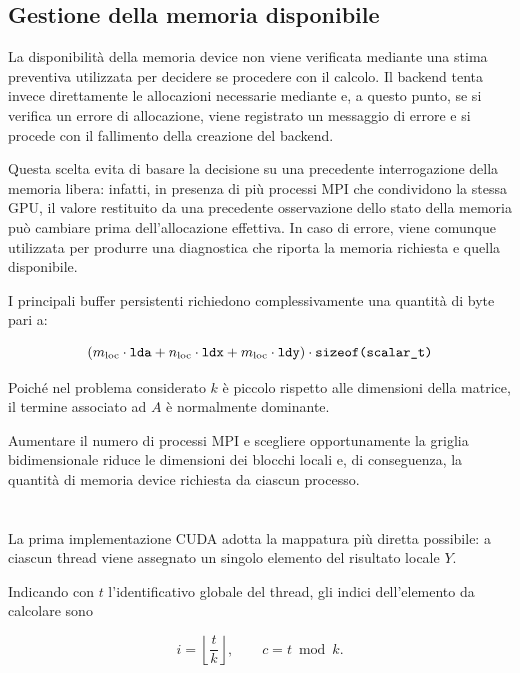 \subsection{Gestione della memoria disponibile}

La disponibilità della memoria device non viene verificata mediante una
stima preventiva utilizzata per decidere se procedere con il calcolo.
Il backend tenta invece direttamente le allocazioni necessarie mediante
 e, a questo punto, se si verifica un errore di allocazione, viene
registrato un messaggio di errore e si procede con il
fallimento della creazione del backend.

Questa scelta evita di basare la decisione su una precedente interrogazione
della memoria libera: infatti, in presenza di più processi MPI che condividono la
stessa GPU, il valore restituito da una precedente osservazione
dello stato della memoria può cambiare prima dell'allocazione effettiva.
In caso di errore,  viene comunque utilizzata per
produrre una diagnostica che riporta la memoria richiesta e quella
disponibile.

I principali buffer persistenti richiedono complessivamente una quantità di byte pari a:

\begin{equation}
\left(
    m_{\text{loc}} \cdot \texttt{lda}
    +
    n_{\text{loc}} \cdot \texttt{ldx}
    +
    m_{\text{loc}} \cdot \texttt{ldy}
\right)
\cdot \texttt{sizeof(scalar\_t)}
\end{equation}

Poiché nel problema considerato $k$ è piccolo rispetto alle dimensioni
della matrice, il termine associato ad $A$ è normalmente dominante.

Aumentare il numero di processi MPI e scegliere opportunamente la griglia
bidimensionale riduce le dimensioni dei blocchi locali e, di conseguenza,
la quantità di memoria device richiesta da ciascun processo.
\section{}\label{sec:naive}

La prima implementazione CUDA adotta la mappatura più diretta possibile:
a ciascun thread viene assegnato un singolo elemento del risultato locale
$Y$.

Indicando con $t$ l'identificativo globale del thread, gli indici
dell'elemento da calcolare sono

\begin{equation}
    i = \left\lfloor \frac{t}{k} \right\rfloor,
    \qquad
    c = t \bmod k.
\end{equation}

